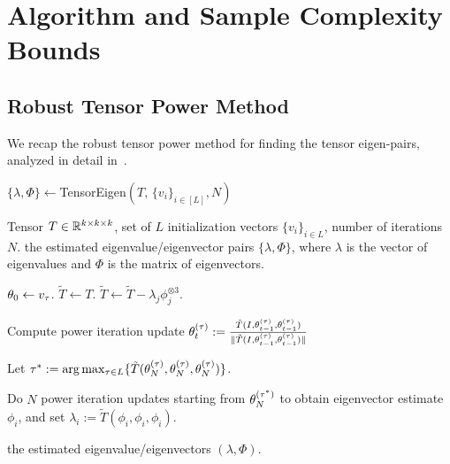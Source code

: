 \section{Algorithm and Sample Complexity Bounds}

\subsection{Robust Tensor Power Method}
We recap the robust tensor power method for finding the tensor eigen-pairs, analyzed in detail in~\cite{AnandkumarEtal:community12}. 

\begin{algorithm}
\caption{$\{\lambda, \Phi\}\leftarrow $TensorEigen$(T,\, \{v_i\}_{i\in [L]}, N)$}\label{alg:robustpower}
\begin{algorithmic}
\renewcommand{\algorithmicrequire}{\textbf{Input: }}
\renewcommand{\algorithmicensure}{\textbf{Output: }}
\REQUIRE Tensor $T\in \mathbb{R}^{k \times k \times k}$, set of $L$ initialization vectors $\{v_i\}_{i\in L}$, number of
iterations  $N$.
\ENSURE the estimated eigenvalue/eigenvector pairs $\{\lambda, \Phi\}$, where $\lambda$ is the vector of eigenvalues and $\Phi$ is the matrix of eigenvectors.

\STATE $\theta_{0}\leftarrow v_\tau$.
\STATE $\tilde{T}\leftarrow T$.
\STATE $\tilde{T}\leftarrow \tilde{T}- \lambda_j \phi_j^{\otimes 3}$.
\ENDIF
\ENDFOR

\STATE Compute power iteration update
$
\theta_{t}^{(\tau)}  :=
\frac{\tilde{T}(I, \theta_{t-1}^{(\tau)}, \theta_{t-1}^{(\tau)})}
{\|\tilde{T}(I, \theta_{t-1}^{(\tau)}, \theta_{t-1}^{(\tau)})\|}
$\ENDFOR
\ENDFOR

\STATE Let $\tau^* := \arg\max_{\tau \in L} \{ \tilde{T}(\theta_{N}^{(\tau)},
\theta_{N}^{(\tau)}, \theta_{N}^{(\tau)}) \}$.

\STATE Do $N$ power iteration updates starting from
$\theta_{N}^{(\tau^*)}$ to obtain eigenvector estimate $\phi_i$, and set $\lambda_i :=
\tilde{T}(\phi_i, \phi_i, \phi_i)$.

\ENDFOR
\RETURN the estimated eigenvalue/eigenvectors
$(\lambda, \Phi)$.

\end{algorithmic}
\end{algorithm}

